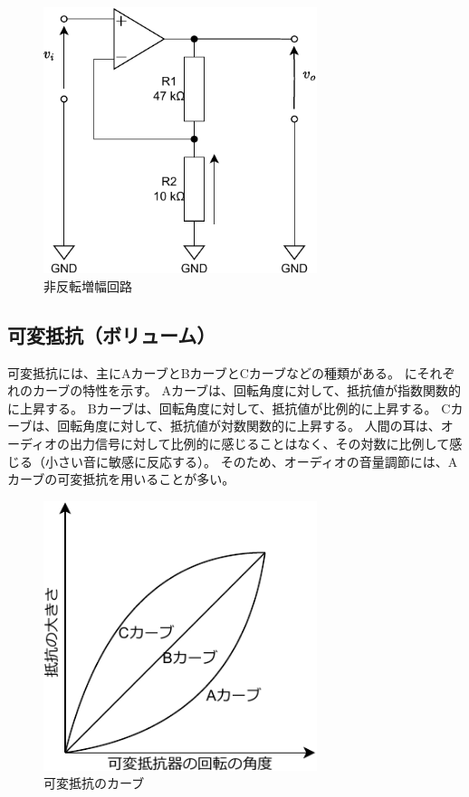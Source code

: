 \documentclass[report.tex]{subfiles}
\begin{document}
\begin{figure}[H]
	\centering
	\includegraphics[width=8cm]{fig/amp2.pdf}
	\caption{非反転増幅回路}
	\label{fig:amplifier-circuit2}
\end{figure}

\subsection{可変抵抗（ボリューム）}

可変抵抗には、主にAカーブとBカーブとCカーブなどの種類がある。
にそれぞれのカーブの特性を示す。
Aカーブは、回転角度に対して、抵抗値が指数関数的に上昇する。
Bカーブは、回転角度に対して、抵抗値が比例的に上昇する。
Cカーブは、回転角度に対して、抵抗値が対数関数的に上昇する。
人間の耳は、オーディオの出力信号に対して比例的に感じることはなく、その対数に比例して感じる（小さい音に敏感に反応する）。
そのため、オーディオの音量調節には、Aカーブの可変抵抗を用いることが多い。

\begin{figure}[H]
	\centering
	\includegraphics[width=8cm]{fig/cabe.pdf}
	\caption{可変抵抗のカーブ}
	\label{fig:cabe}
\end{figure}
\end{document}
